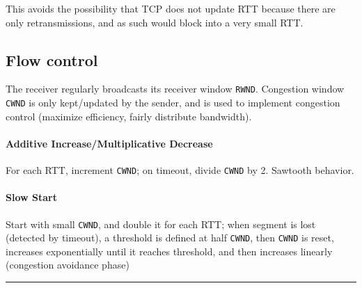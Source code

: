 \documentclass{form}
\begin{document}
\begin{minipage}[c]{0.39\textwidth}
    This avoids the possibility that TCP does not update RTT because there are only retransmissions, and as such would block into a very small RTT.

    \subsection*{Flow control}

    The receiver regularly broadcasts its receiver window \texttt{RWND}.
    Congestion window \texttt{CWND} is only kept/updated by the sender, and is used to implement congestion control (maximize efficiency, fairly distribute bandwidth).

    \paragraph{Additive Increase/Multiplicative Decrease}
    For each RTT, increment \texttt{CWND}; on timeout, divide \texttt{CWND} by 2. Sawtooth behavior.

    \paragraph{Slow Start}
    Start with small \texttt{CWND}, and double it for each RTT; when segment is lost (detected by timeout), a threshold is defined at half \texttt{CWND}, then \texttt{CWND} is reset, increases exponentially until it reaches threshold, and then increases linearly (congestion avoidance phase)
\end{minipage}

\vspace{-0em}\rule{\textwidth}{1.0pt}\vspace{-1.0em}
\end{document}
